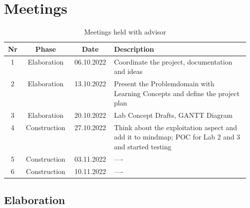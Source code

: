 \chapter{Meetings}
\label{meeting_chapter}

\begin{table}[H]
    \centering
    \begin{tabular}{| c | c | c | p{0.57\linewidth} |}
        \hline 
        Nr & Phase & Date & Description \\
        \hline \hline
        1 & Elaboration & 06.10.2022 & Coordinate the project, documentation \- and ideas \\
        \hline
        2 & Elaboration & 13.10.2022 & Present the Problemdomain with Learning Concepts and define the project plan \\
        \hline
        3 & Elaboration & 20.10.2022 & Lab Concept Drafts, GANTT Diagram  \\
        \hline
        4 & Construction & 27.10.2022 & Think about the exploitation aspect and add it to mindmap; POC for Lab 2 and 3 and started testing \\
        \hline
        5 & Construction & 03.11.2022 & ---- \\
        \hline
        6 & Construction & 10.11.2022 & ---- \\
        \hline
    \end{tabular}
    \caption{Meetings held with advisor}
    \label{meetings_hold_table}
\end{table}
\section{Elaboration}
